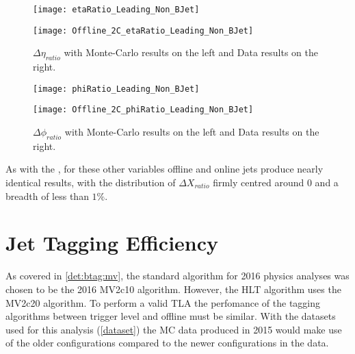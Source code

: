 	\begin{figure}[h]
		\centering
		\begin{minipage}[h]{0.33\linewidth}
			\texttt{[image: etaRatio\_Leading\_Non\_BJet]}
			
		\end{minipage}
		\quad
		\begin{minipage}[h]{0.33\linewidth}
			\texttt{[image: Offline\_2C\_etaRatio\_Leading\_Non\_BJet]}
		\end{minipage}
		\caption{$\Delta \eta_{ratio}$ with Monte-Carlo results on the left and Data results on the right.}
		\label{fig:O:leadingnonbeta}
	\end{figure}
	
	\begin{figure}[h]
		\centering
		\begin{minipage}[h]{0.33\linewidth}
			\texttt{[image: phiRatio\_Leading\_Non\_BJet]}
			
		\end{minipage}
		\quad
		\begin{minipage}[h]{0.33\linewidth}
			\texttt{[image: Offline\_2C\_phiRatio\_Leading\_Non\_BJet]}
		\end{minipage}
		\caption{$\Delta \phi_{ratio}$ with Monte-Carlo results on the left and Data results on the right.}
		\label{fig:O:leadingnonbphi}
	\end{figure}
	
	As with the \bjets, for these other variables offline and online jets produce nearly identical results, with the distribution of $\Delta X_{ratio}$ firmly centred around 0 and a breadth of less than $1\%$.

	
	
\newpage
\section{Jet Tagging Efficiency}

	As covered in \ref{det:btag:mv}, the standard algorithm for 2016 physics analyses was chosen to be the 2016 MV2c10 algorithm. However, the HLT \btag algorithm uses the MV2c20 algorithm. \cite{trig2015} To perform a valid TLA the perfomance of the tagging algorithms between trigger level and offline must be similar. With the datasets used for this analysis (\ref{dataset}) the MC data produced in 2015 would make use of the older configurations compared to the newer configurations in the data. 

